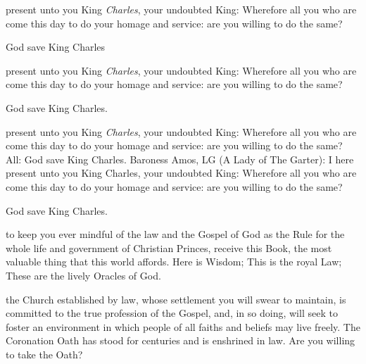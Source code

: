 {\vfill
\clearpage



 present unto you
King \textit{Charles}, your undoubted King:
Wherefore all you who are come this day
to do your homage and service:
are you willing to do the same?
\vfill 

God save King Charles
\vfill 






 present unto you
King \textit{Charles}, your undoubted King:
Wherefore all you who are come this day
to do your homage and service:
are you willing to do the same?


God save King Charles.



 present unto you
King \textit{Charles}, your undoubted King:
Wherefore all you who are come this day
to do your homage and service:
are you willing to do the same?
All:
God save King Charles.
Baroness Amos, LG (A Lady of The Garter):
I here present unto you
King Charles, your undoubted King:
Wherefore all you who are come this day
to do your homage and service:
are you willing to do the same?


God save King Charles.







 to keep you ever mindful of the law and the Gospel of God
as the Rule for the whole life and government of Christian Princes,
receive this Book,
the most valuable thing that this world affords.
Here is Wisdom;
This is the royal Law;
These are the lively Oracles of God.




the Church established by law, whose settlement you will swear to
maintain, is committed to the true profession of the Gospel, and, in so
doing, will seek to foster an environment in which people of all faiths and
beliefs may live freely. The Coronation Oath has stood for centuries and is
enshrined in law.
Are you willing to take the Oath?

}
